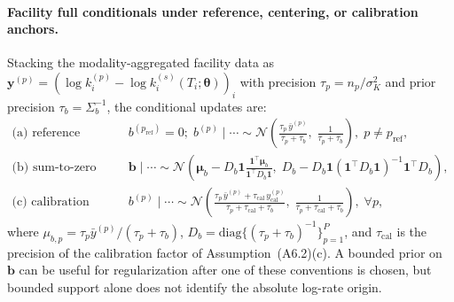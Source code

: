 \documentclass[12pt]{article}
\theoremstyle{plain}
\theoremstyle{definition}
\theoremstyle{remark}
\begin{document}
\paragraph{Facility full conditionals under reference, centering, or calibration anchors.}
Stacking the modality-aggregated facility data as
$\mathbf{y}^{(p)} = (\log k^{(p)}_i - \log k_i^{(s)}(T_i;\boldsymbol\theta))_i$
with precision $\tau_p = n_p/\sigma_K^2$ and prior precision
$\tau_b = \Sigma_b^{-1}$, the conditional updates are:
%
\begin{align}
  \text{(a) reference anchor:}\quad
  & b^{(p_{\mathrm{ref}})} = 0;\;
    b^{(p)} \mid \cdots \sim \mathcal{N}\!\left(\frac{\tau_p\,\bar{y}^{(p)}}{\tau_p+\tau_b},\;
      \frac{1}{\tau_p+\tau_b}\right),\;p\ne p_{\mathrm{ref}},
  \label{eq:fc_b_a}\\
  \text{(b) sum-to-zero centering:}\quad
  & \mathbf{b}\mid \cdots \sim
    \mathcal{N}\!\left(\boldsymbol\mu_b
      -D_b\mathbf{1}\frac{\mathbf{1}^\top\boldsymbol\mu_b}
       {\mathbf{1}^\top D_b\mathbf{1}},\;
      D_b-D_b\mathbf{1}(\mathbf{1}^\top D_b\mathbf{1})^{-1}\mathbf{1}^\top D_b\right),
  \label{eq:fc_b_b}\\
  \text{(c) calibration anchor:}\quad
  & b^{(p)} \mid \cdots \sim
    \mathcal{N}\!\left(\frac{\tau_p\,\bar{y}^{(p)} + \tau_{\mathrm{cal}}\,y_{\mathrm{cal}}^{(p)}}{\tau_p+\tau_{\mathrm{cal}}+\tau_b},\;
      \frac{1}{\tau_p+\tau_{\mathrm{cal}}+\tau_b}\right),\;\forall p,
  \label{eq:fc_b_c}
\end{align}
%
where $\mu_{b,p}=\tau_p\bar y^{(p)}/(\tau_p+\tau_b)$,
$D_b=\mathrm{diag}\{(\tau_p+\tau_b)^{-1}\}_{p=1}^P$, and
$\tau_{\mathrm{cal}}$ is the precision of the calibration factor of
Assumption~(A6.2)(c).  A bounded prior on $\mathbf{b}$ can be useful for
regularization after one of these conventions is chosen, but bounded support
alone does not identify the absolute log-rate origin.
\end{document}

